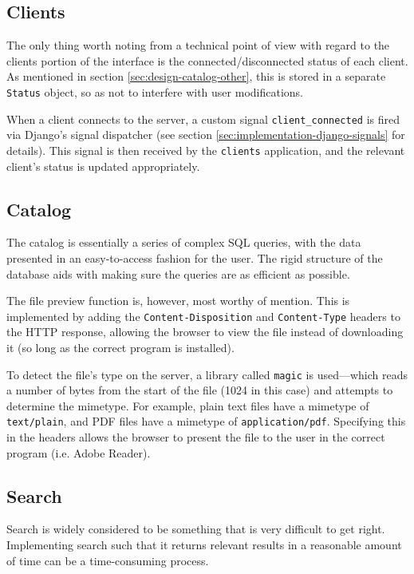 \subsection{Clients}

The only thing worth noting from a technical point of view with regard to the
clients portion of the interface is the connected/disconnected status of each
client. As mentioned in section \ref{sec:design-catalog-other}, this is stored
in a separate \verb!Status! object, so as not to interfere with user
modifications.

When a client connects to the server, a custom signal \verb!client_connected!
is fired via Django's signal dispatcher (see section
\ref{sec:implementation-django-signals} for details). This signal is then
received by the \verb!clients! application, and the relevant client's status is
updated appropriately.

\subsection{Catalog}

The catalog is essentially a series of complex SQL queries, with the data
presented in an easy-to-access fashion for the user. The rigid structure of the
database aids with making sure the queries are as efficient as possible.

The file preview function is, however, most worthy of mention. This is
implemented by adding the \verb!Content-Disposition! and \verb!Content-Type!
headers to the HTTP response, allowing the browser to view the file instead of
downloading it (so long as the correct program is installed).

To detect the file's type on the server, a library called \verb!magic! is
used---which reads a number of bytes from the start of the file (1024 in this
case) and attempts to determine the mimetype. For example, plain text files
have a mimetype of \verb!text/plain!, and PDF files have a mimetype of
\verb!application/pdf!.  Specifying this in the headers allows the browser to
present the file to the user in the correct program (i.e. Adobe Reader).

\subsection{Search}
\label{sec:implementation-web-search}

Search is widely considered to be something that is very difficult to get
right. Implementing search such that it returns relevant results in
a reasonable amount of time can be a time-consuming process.

